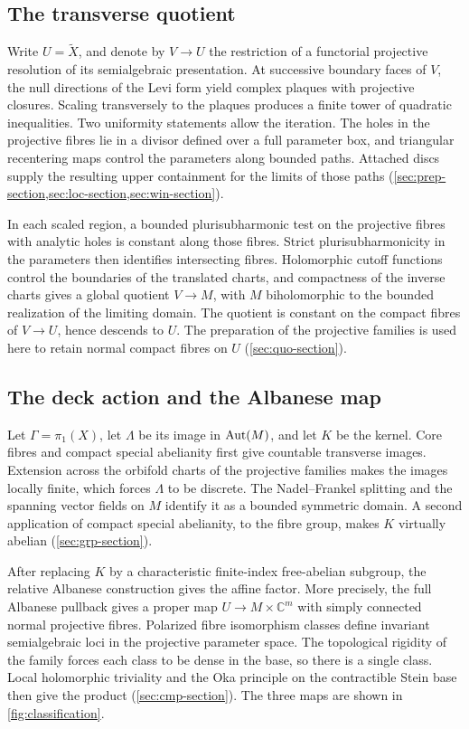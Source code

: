 \documentclass[11pt,a4paper]{amsart}
\begin{document}
\subsection{The transverse quotient}

Write $U=\widetilde X$, and denote by $V\to U$ the restriction of a functorial projective resolution of its semialgebraic presentation. At successive boundary faces of $V$, the null directions of the Levi form yield complex plaques with projective closures. Scaling transversely to the plaques produces a finite tower of quadratic inequalities. Two uniformity statements allow the iteration. The holes in the projective fibres lie in a divisor defined over a full parameter box, and triangular recentering maps control the parameters along bounded paths. Attached discs supply the resulting upper containment for the limits of those paths (\cref{sec:prep-section,sec:loc-section,sec:win-section}).

In each scaled region, a bounded plurisubharmonic test on the projective fibres with analytic holes is constant along those fibres. Strict plurisubharmonicity in the parameters then identifies intersecting fibres. Holomorphic cutoff functions control the boundaries of the translated charts, and compactness of the inverse charts gives a global quotient $V\to M$, with $M$ biholomorphic to the bounded realization of the limiting domain. The quotient is constant on the compact fibres of $V\to U$, hence descends to $U$. The preparation of the projective families is used here to retain normal compact fibres on $U$ (\cref{sec:quo-section}).

\subsection{The deck action and the Albanese map}

Let $\Gamma=\pi_1(X)$, let $\Lambda$ be its image in $\operatorname{Aut}(M)$, and let $K$ be the kernel. Core fibres and compact special abelianity first give countable transverse images. Extension across the orbifold charts of the projective families makes the images locally finite, which forces $\Lambda$ to be discrete. The Nadel--Frankel splitting and the spanning vector fields on $M$ identify it as a bounded symmetric domain. A second application of compact special abelianity, to the fibre group, makes $K$ virtually abelian (\cref{sec:grp-section}).

After replacing $K$ by a characteristic finite-index free-abelian subgroup, the relative Albanese construction gives the affine factor. More precisely, the full Albanese pullback gives a proper map $U\to M\times\mathbb{C}^m$ with simply connected normal projective fibres. Polarized fibre isomorphism classes define invariant semialgebraic loci in the projective parameter space. The topological rigidity of the family forces each class to be dense in the base, so there is a single class. Local holomorphic triviality and the Oka principle on the contractible Stein base then give the product (\cref{sec:cmp-section}). The three maps are shown in \cref{fig:classification}.
\end{document}

